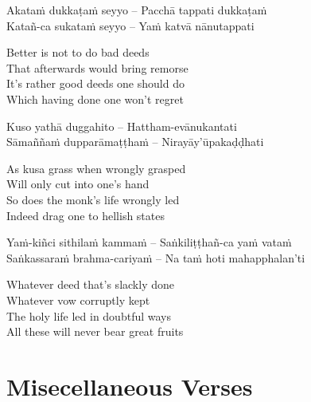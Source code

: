 \begin{twochants}
  Akataṁ dukkaṭaṁ seyyo – Pacchā tappati dukkaṭaṁ\\
  Katañ-ca sukataṁ seyyo – Yaṁ katvā nānutappati\\
\end{twochants}

\begin{english-verses}
  Better is not to do bad deeds\\
  That afterwards would bring remorse\\
  It's rather good deeds one should do\\
  Which having done one won't regret
\end{english-verses}

\begin{twochants}
  Kuso yathā duggahito – Hattham-evānukantati\\
  Sāmaññaṁ dupparāmaṭṭhaṁ – Nirayāy'ūpakaḍḍhati\\
\end{twochants}

\begin{english-verses}
  As kusa grass when wrongly grasped\\
  Will only cut into one's hand\\
  So does the monk's life wrongly led\\
  Indeed drag one to hellish states
\end{english-verses}

\begin{twochants}
  Yaṁ-kiñci sithilaṁ kammaṁ – Saṅkiliṭṭhañ-ca yaṁ vataṁ\\
  Saṅkassaraṁ brahma-cariyaṁ – Na taṁ hoti mahapphalan'ti\\
\end{twochants}

\begin{english-verses}
  Whatever deed that's slackly done\\
  Whatever vow corruptly kept\\
  The holy life led in doubtful ways\\
  All these will never bear great fruits
\end{english-verses}

\suttaRef{[SN 2.8]}


\section{Misecellaneous Verses}
\label{misc-verses}

